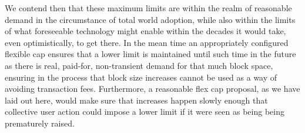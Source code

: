 We contend then that these maximum limits are within the realm of
reasonable demand in the circumstance of total world adoption, while
also within the limits of what foreseeable technology might enable
within the decades it would take, even optimistically, to get there.
In the mean time an appropriately configured flexible cap ensures that
a lower limit is maintained until such time in the future as there is
real, paid-for, non-transient demand for that much block space,
ensuring in the process that block size increases cannot be used as a
way of avoiding transaction fees.  Furthermore, a reasonable flex cap
proposal, as we have laid out here, would make sure that increases
happen slowly enough that collective user action could impose a lower
limit if it were seen as being being prematurely raised.
